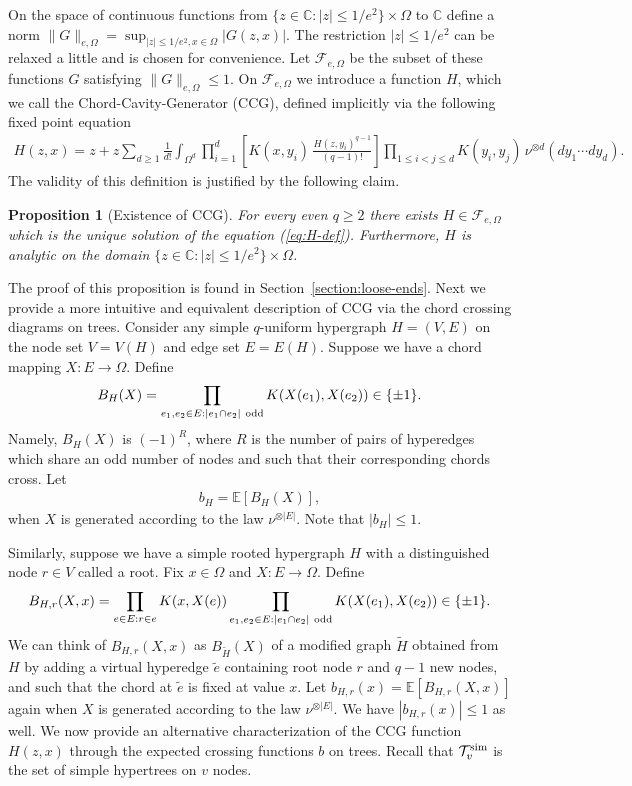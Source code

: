 \documentclass[12pt]{article}
\newtheorem{proposition}[theorem]{Proposition}
\newcommand{\E}{\mathbb{E}}
\newcommand{\C}{\mathbb{C}}
\newcommand{\cT}{\mathcal{T}}
\begin{document}
On the space of continuous functions from $\{z\in \C: |z|\le 1/e^2\}\times \Omega$ to $\C$ 
define a norm $\|G\|_{e,\Omega}=\sup_{|z| \le 1/e^2, x\in\Omega} |G(z,x)|$. 
The restriction $|z|\le 1/e^2$ can be relaxed a little and is chosen for convenience.
Let $\mathcal{F}_{e,\Omega}$ 
be the subset of these functions $G$ satisfying $\|G\|_{e,\Omega}\le 1$.
On $\mathcal{F}_{e,\Omega}$ we introduce a function $H$, which 
we call the Chord-Cavity-Generator (CCG), defined implicitly via
the following fixed point equation
\begin{align}\label{eq:H-def}
 H(z,x)
        =
        z+ z\sum_{d\geq 1}\frac{1}{d!}
        \int_{\Omega^d}
        \prod_{i=1}^d
        \left[
            K(x,y_i)\,\frac{H(z,y_i)^{q-1}}{(q-1)!}
        \right]
        \prod_{1\leq i<j\leq d} K(y_i,y_j)\,
        \nu^{\otimes d}(dy_1\cdots dy_d).
\end{align}
The validity of this definition is justified by the following claim.
\begin{proposition}[Existence of CCG]\label{prop:existsCCG}
For every even $q\ge 2$ there exists $H\in\mathcal{F}_{e,\Omega}$ which is the unique solution of the equation (\ref{eq:H-def}). 
Furthermore, $H$ is analytic on the domain $\{z\in \C: |z|\le 1/e^2\}\times \Omega$.
\end{proposition}
The proof of this proposition is found in Section~\ref{section:loose-ends}.
Next we  provide a more intuitive and equivalent description of CCG via the chord crossing diagrams on trees. Consider any simple 
$q$-uniform hypergraph $H=(V,E)$ on the node set $V=V(H)$ and edge set $E=E(H)$.  
Suppose we have a chord mapping $X:E\to \Omega$. Define  
\begin{align*}
B_H(X)=\prod_{e_1,e_2\in E: |e_1\cap e_2|~{\rm odd}}K(X(e_1),X(e_2))\in \{\pm 1\}.
\end{align*}
Namely, $B_H(X)$ is $(-1)^R$, where $R$ is  the number of pairs of hyperedges which share an odd number of nodes and such that their corresponding chords cross. 
Let 
\begin{align}
b_H=\E[B_H(X)], \label{eq:b_H}
\end{align}
when $X$ is generated according to  the law $\nu^{\otimes |E|}$. Note that $| b_H|\le 1$.

Similarly, suppose we have a simple rooted hypergraph $H$ with a distinguished node $r\in V$ called a root. Fix $x\in \Omega$
and $X:E\to\Omega$. Define
\begin{align}
B_{H,r}(X,x)=\prod_{e\in E:r\in e}K(x,X(e)) 
\prod_{e_1,e_2\in E:|e_1\cap e_2|~{\rm odd}}K(X(e_1),X(e_2))\in \{\pm 1\}. \label{eq:Bhr}
\end{align}
We can think of $B_{H,r}(X,x)$ as $B_{\tilde H}(X)$ of a modified graph $\tilde H$ obtained from $H$ by adding a virtual hyperedge $\tilde e$
containing root node $r$ and $q-1$ new nodes, and such that the chord at $\tilde e$ is fixed  at value $x$. 
Let $b_{H,r}(x)=\E[B_{H,r}(X,x)]$ again when $X$ is generated according to the law $\nu^{\otimes |E|}$. We have $| b_{H,r}(x) |\le 1$ as well.
We now provide an alternative characterization of the CCG function $H(z,x)$ through the 
expected crossing functions $b$ on trees. Recall that $\cT^{\rm sim}_v$ is the set of simple hypertrees on $v$ nodes.
\end{document}
